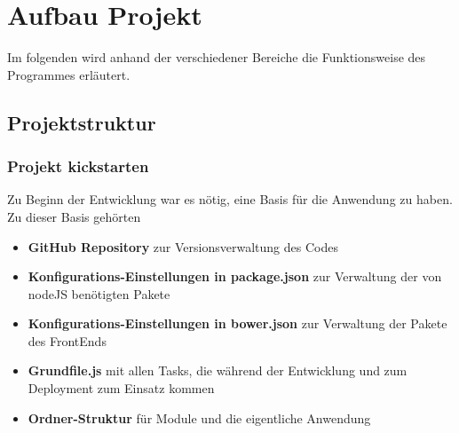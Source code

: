 \chapter{Aufbau Projekt}
Im folgenden wird anhand der verschiedener Bereiche die Funktionsweise des Programmes erläutert.


\section{Projektstruktur}
\subsection{Projekt kickstarten}
Zu Beginn der Entwicklung war es nötig, eine Basis für die Anwendung zu haben. Zu dieser Basis gehörten
\begin{itemize}
\item \textbf{GitHub Repository} zur Versionsverwaltung des Codes
\item \textbf{Konfigurations-Einstellungen in package.json} zur Verwaltung der von nodeJS benötigten Pakete
\item \textbf{Konfigurations-Einstellungen in bower.json} zur Verwaltung der Pakete des FrontEnds
\item \textbf{Grundfile.js} mit allen Tasks, die während der Entwicklung und zum Deployment zum Einsatz kommen
\item \textbf{Ordner-Struktur} für Module und die eigentliche Anwendung
\end{itemize}

